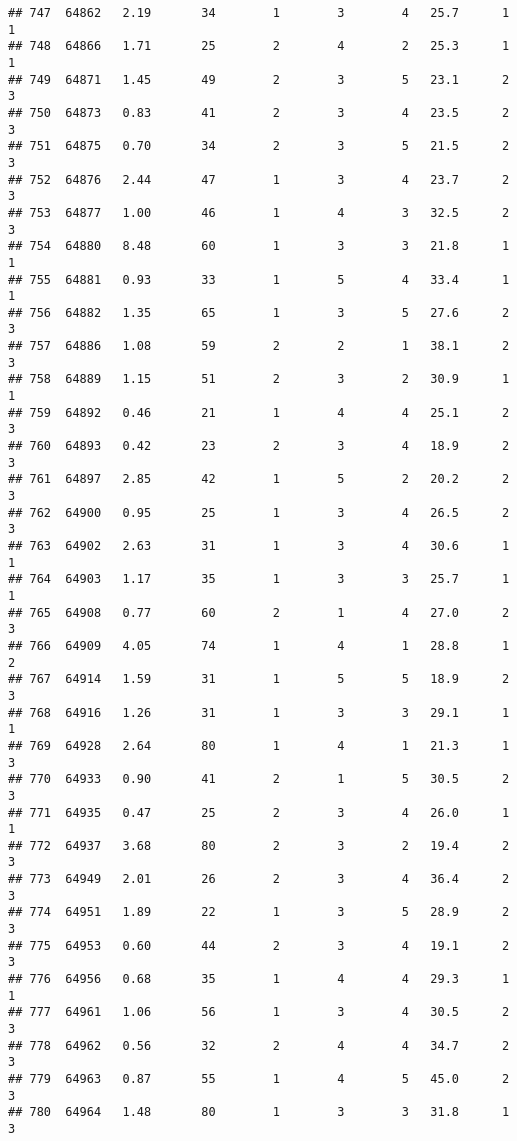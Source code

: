 \documentclass[
]{article}
\begin{document}
\begin{verbatim}
## 747  64862   2.19       34        1        3        4   25.7      1      1
## 748  64866   1.71       25        2        4        2   25.3      1      1
## 749  64871   1.45       49        2        3        5   23.1      2      3
## 750  64873   0.83       41        2        3        4   23.5      2      3
## 751  64875   0.70       34        2        3        5   21.5      2      3
## 752  64876   2.44       47        1        3        4   23.7      2      3
## 753  64877   1.00       46        1        4        3   32.5      2      3
## 754  64880   8.48       60        1        3        3   21.8      1      1
## 755  64881   0.93       33        1        5        4   33.4      1      1
## 756  64882   1.35       65        1        3        5   27.6      2      3
## 757  64886   1.08       59        2        2        1   38.1      2      3
## 758  64889   1.15       51        2        3        2   30.9      1      1
## 759  64892   0.46       21        1        4        4   25.1      2      3
## 760  64893   0.42       23        2        3        4   18.9      2      3
## 761  64897   2.85       42        1        5        2   20.2      2      3
## 762  64900   0.95       25        1        3        4   26.5      2      3
## 763  64902   2.63       31        1        3        4   30.6      1      1
## 764  64903   1.17       35        1        3        3   25.7      1      1
## 765  64908   0.77       60        2        1        4   27.0      2      3
## 766  64909   4.05       74        1        4        1   28.8      1      2
## 767  64914   1.59       31        1        5        5   18.9      2      3
## 768  64916   1.26       31        1        3        3   29.1      1      1
## 769  64928   2.64       80        1        4        1   21.3      1      3
## 770  64933   0.90       41        2        1        5   30.5      2      3
## 771  64935   0.47       25        2        3        4   26.0      1      1
## 772  64937   3.68       80        2        3        2   19.4      2      3
## 773  64949   2.01       26        2        3        4   36.4      2      3
## 774  64951   1.89       22        1        3        5   28.9      2      3
## 775  64953   0.60       44        2        3        4   19.1      2      3
## 776  64956   0.68       35        1        4        4   29.3      1      1
## 777  64961   1.06       56        1        3        4   30.5      2      3
## 778  64962   0.56       32        2        4        4   34.7      2      3
## 779  64963   0.87       55        1        4        5   45.0      2      3
## 780  64964   1.48       80        1        3        3   31.8      1      3

\end{verbatim}
\end{document}
